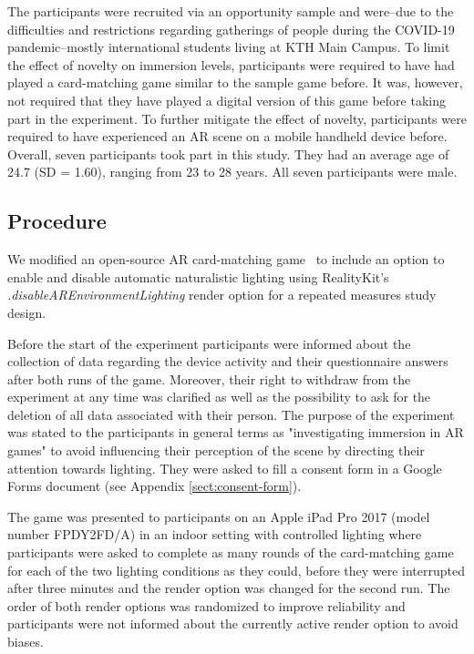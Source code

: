 \documentclass[12pt,twoside,english]{article}
\begin{document}
The participants were recruited via an opportunity sample and were--due to the difficulties and restrictions regarding gatherings of people during the COVID-19 pandemic--mostly international students living at KTH Main Campus.
To limit the effect of novelty on immersion levels, participants were required to have had played a card-matching game similar to the sample game before.
It was, however, not required that they have played a digital version of this game before taking part in the experiment.
To further mitigate the effect of novelty, participants were required to have experienced an \gls{AR} scene on a mobile handheld device before.
Overall, seven participants took part in this study.
They had an average age of 24.7 (SD = 1.60), ranging from 23 to 28 years.
All seven participants were male.

\subsection{Procedure}
\label{sect:procedure}

We modified an open-source \gls{AR} card-matching game~\cite{cobb_maxxfrazerrealitykit-cardflip_2020} to include an option to enable and disable automatic naturalistic lighting using RealityKit's \textit{.disableAREnvironmentLighting} render option for a repeated measures study design.

Before the start of the experiment participants were informed about the collection of data regarding the device activity and their questionnaire answers after both runs of the game.
Moreover, their right to withdraw from the experiment at any time was clarified as well as the possibility to ask for the deletion of all data associated with their person.
The purpose of the experiment was stated to the participants in general terms as "investigating immersion in \gls{AR} games" to avoid influencing their perception of the scene by directing their attention towards lighting. 
They were asked to fill a consent form in a Google Forms document (see Appendix \ref{sect:consent-form}).

The game was presented to participants on an Apple iPad Pro 2017 (model number FPDY2FD/A) in an indoor setting with controlled lighting where participants were asked to complete as many rounds of the card-matching game for each of the two lighting conditions as they could, before they were interrupted after three minutes and the render option was changed for the second run.
The order of both render options was randomized to improve reliability and participants were not informed about the currently active render option to avoid biases.
\end{document}
